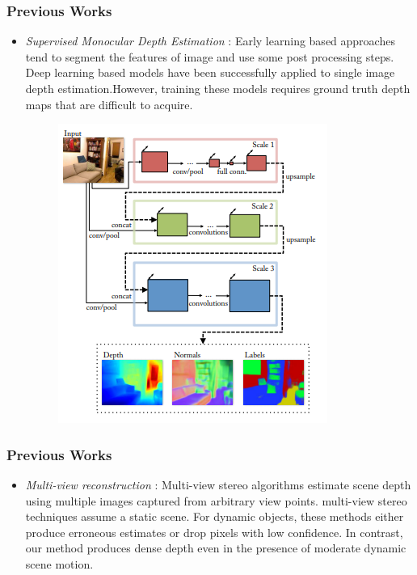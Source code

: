 \documentclass{beamer}
\begin{document}
	\begin{frame}
	\frametitle{Previous Works}
	\begin{itemize}
	
	\item \textit{Supervised Monocular Depth Estimation} : Early learning based approaches tend to segment the features of image and use some post processing steps. Deep learning based models have been successfully applied to single image depth estimation.However, training these models requires ground truth depth maps that are difficult to acquire.
	
		\begin{center}
			\begin{figure}
				\includegraphics[height=0.4\textheight]{imgs/dl.png}
				\caption{\textcite{eigen2015predicting}}
			\end{figure}
			
		\end{center}
	
	\end{itemize}
	\end{frame}
	
	\begin{frame}
	\frametitle{Previous Works}
	\begin{itemize}
	
	\item \textit{Multi-view reconstruction} : Multi-view stereo algorithms estimate
	scene depth using multiple images captured from arbitrary view points. multi-view stereo techniques assume a static scene.
	For dynamic objects, these methods either produce erroneous estimates or drop pixels with low confidence. In contrast, our method
	produces dense depth even in the presence of moderate dynamic scene motion.
	\end{itemize}
	\end{frame}
	
\end{document}
